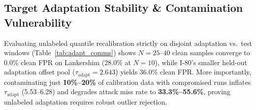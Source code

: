 \documentclass[journal]{IEEEtran}
\begin{document}


\begin{table}[t]
\centering
\caption{Intermittent Bursts \& Adaptive Stealth Stress Tests (Unseen I-80)}
\label{tab:rand_int}
\scriptsize
\setlength{\tabcolsep}{1.6pt}
\end{table}

\subsection{Target Adaptation Stability \& Contamination Vulnerability}
\label{sec:ablations}
Evaluating unlabeled quantile recalibration strictly on disjoint adaptation vs.\ test windows (Table~\ref{tab:adapt_comms}) shows $N=25\text{--}40$ clean samples converge to 0.0\% clean FPR on Lankershim (28.0\% at $N=10$), while I-80's smaller held-out adaptation offset pool ($\tau_{\text{adapt}}=2.643$) yields 36.0\% clean FPR. More importantly, contaminating just \textbf{10\%--20\%} of calibration data with compromised runs inflates $\tau_{\text{adapt}}$ (5.53--6.28) and degrades attack miss rate to \textbf{33.3\%--55.6\%}, proving unlabeled adaptation requires robust outlier rejection.
\end{document}
